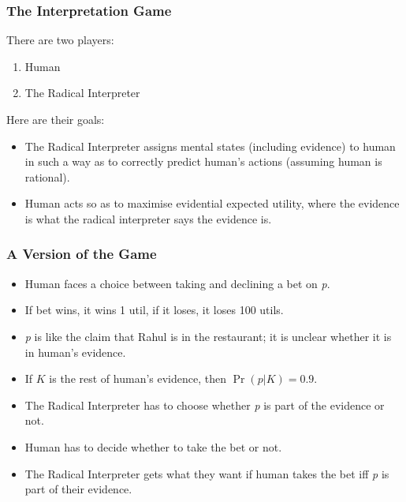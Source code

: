 \begin{frame}

\frametitle{The Interpretation Game}
\label{theinterpretationgame}

There are two players:

\begin{enumerate}
\item Human

\item The Radical Interpreter

\end{enumerate}
Here are their goals:

\begin{itemize}
\item The Radical Interpreter assigns mental states (including evidence) to human in such a way as to correctly predict human's actions (assuming human is rational).

\item Human acts so as to maximise evidential expected utility, where the evidence is what the radical interpreter says the evidence is.

\end{itemize}
\end{frame}

\begin{frame}

\frametitle{A Version of the Game}
\label{aversionofthegame}

\begin{itemize}
\item Human faces a choice between taking and declining a bet on \emph{p}.

\item If bet wins, it wins 1 util, if it loses, it loses 100 utils.

\item \emph{p} is like the claim that Rahul is in the restaurant; it is unclear whether it is in human's evidence.

\item If $K$ is the rest of human's evidence, then $\Pr(p | K) = 0.9$.

\item The Radical Interpreter has to choose whether \emph{p} is part of the evidence or not.

\item Human has to decide whether to take the bet or not.

\item The Radical Interpreter gets what they want if human takes the bet iff \emph{p} is part of their evidence.

\end{itemize}
\end{frame}

